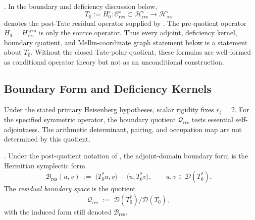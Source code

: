 \begin{remark}
\label{v4-arith:w9-r4:rem:post-tate-notation}
\ClaimStatusDefinitional. In the boundary and deficiency discussion
below,
\[
T_{0}:=H_{0}^{\circ}\colon
\mathcal{C}_{\mathrm{res}}^{\circ}\subset
\mathcal{H}_{\mathrm{res}}^{\circ}\longrightarrow
\mathcal{H}_{\mathrm{res}}^{\circ}
\]
denotes the post-Tate residual operator supplied by
. The
pre-quotient operator \(H_{0}=H_{\mathrm{res}}^{\mathrm{sym}}\) is only
the source operator. Thus every adjoint, deficiency kernel, boundary
quotient, and Mellin-coordinate graph statement below is a statement
about \(T_{0}\). Without the closed Tate-polar quotient, these formulas
are well-formed as conditional operator theory but not as an
unconditional construction.
\end{remark}

\subsection{Boundary Form and Deficiency Kernels}
\label{v4-arith:w9-r4:pdnf:what-remains}

Under the stated primary Heisenberg hypotheses, scalar rigidity
fixes \(r_{\zeta}=2\). For the specified symmetric operator, the
boundary quotient \(\mathcal Q_{\mathrm{res}}\) tests essential
self-adjointness. The arithmetic determinant, pairing, and occupation
map are not determined by this quotient.

\begin{definition}
\label{v4-arith:w9-r4:def:residual-boundary-form}
\ClaimStatusDefinitional. Under the post-quotient notation of
, the adjoint-domain
boundary form is the Hermitian symplectic form
\begin{equation}
\label{v4-arith:w9-r4:eq:boundary-form}
\mathcal{B}_{\mathrm{res}}(u,v)
\;:=\;
\langle T_{0}^{*}u,v\rangle-\langle u,T_{0}^{*}v\rangle,
\qquad
u,v\in\mathcal{D}(T_{0}^{*}).
\end{equation}
The \emph{residual boundary space} is the quotient
\begin{equation}
\label{v4-arith:w9-r4:eq:boundary-space}
\mathcal{Q}_{\mathrm{res}}
\;:=\;
\mathcal{D}(T_{0}^{*})/\mathcal{D}(\overline{T_{0}}),
\end{equation}
with the induced form still denoted \(\mathcal{B}_{\mathrm{res}}\).
\end{definition}

